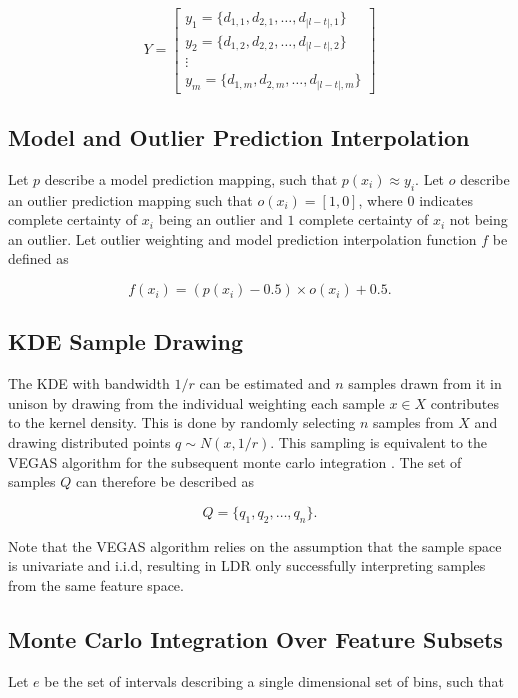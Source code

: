 \documentclass[a4paper, twocolumn]{article}
\begin{document}
$$Y =
\begin{bmatrix}
{y_1 = \{d_{1, 1}, d_{2, 1}, \ldots, d_{|l-t|, 1}\}} \\
{y_2 = \{d_{1, 2}, d_{2, 2}, \ldots, d_{|l-t|, 2}\}} \\
\vdots \\
{y_m = \{d_{1, m}, d_{2, m}, \ldots, d_{|l-t|, m}\}}
\end{bmatrix}
$$

\subsection{Model and Outlier Prediction Interpolation}

Let $p$ describe a model prediction mapping, such that $p(x_i) \approx y_i$. Let $o$ describe an outlier prediction mapping such that $o(x_i) = [1, 0]$, where $0$ indicates complete certainty of $x_i$ being an outlier and $1$ complete certainty of $x_i$ not being an outlier. Let outlier weighting and model prediction interpolation function $f$ be defined as

$$f(x_i) = (p(x_i) - 0.5) \times o(x_i) + 0.5.$$

\subsection{KDE Sample Drawing}

The KDE with bandwidth $1/r$ can be estimated and $n$ samples drawn from it in unison by drawing from the individual weighting each sample $x \in X$ contributes to the kernel density. This is done by randomly selecting $n$ samples from $X$ and drawing distributed points $q \sim N(x, 1/r)$. This sampling is equivalent to the VEGAS algorithm for the subsequent monte carlo integration \cite{lepage1978new}. The set of samples $Q$ can therefore be described as

$$Q = \{q_1, q_2, \ldots, q_n\}.$$

Note that the VEGAS algorithm relies on the assumption that the sample space is univariate and i.i.d, resulting in LDR only successfully interpreting samples from the same feature space.

\subsection{Monte Carlo Integration Over Feature Subsets}

Let $e$ be the set of intervals describing a single dimensional set of bins, such that
\end{document}
